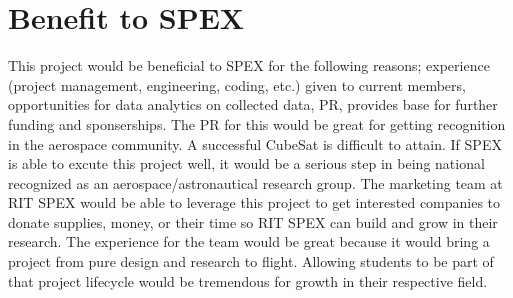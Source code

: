 \documentclass[conference]{IEEEtran} %
\begin{document}



\section{Benefit to SPEX}
\label{sec:benefit}
This project would be beneficial to SPEX for the following reasons; experience (project management, engineering, coding, etc.) given to current members, opportunities
for data analytics on collected data, PR, provides base for further funding and sponserships. The PR for this would be great for getting recognition in the aerospace community. A successful CubeSat is
difficult to attain. If SPEX is able to excute this project well, it would be a serious step in being national recognized as an aerospace/astronautical research group.
The marketing team at RIT SPEX would be able to leverage this project to get interested companies to donate supplies, money, or their time so RIT SPEX can build
and grow in their research. The experience for the team would be great because it would bring a project from pure design and research to flight. Allowing students
to be part of that project lifecycle would be tremendous for growth in their respective field.
\end{document}

